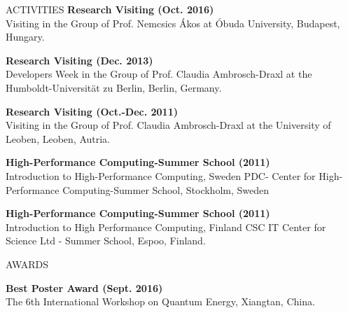 \documentclass{resume} %
\begin{document}
\begin{rSection}{ACTIVITIES}
\textbf{Research Visiting (Oct. 2016)} \\
Visiting in the Group of Prof. Nemcsics Ákos at Óbuda University, Budapest, Hungary.


\textbf{Research Visiting (Dec. 2013)} \\
Developers Week in the Group of Prof. Claudia Ambrosch-Draxl at the Humboldt-Universität zu Berlin, Berlin, Germany.

\textbf{Research Visiting (Oct.-Dec. 2011)} \\
Visiting in the Group of Prof. Claudia Ambrosch-Draxl at the University of Leoben, Leoben, Autria.

\textbf{High-Performance Computing-Summer School (2011)} \\
Introduction to High-Performance Computing, Sweden PDC- Center for High-Performance Computing-Summer School, Stockholm, Sweden

\textbf{High-Performance Computing-Summer School (2011)} \\
Introduction to High Performance Computing, Finland CSC IT Center for Science Ltd - Summer School, Espoo, Finland.

\end{rSection}


\begin{rSection}{AWARDS}

\textbf{Best Poster Award (Sept. 2016)} \\
The 6th International Workshop on Quantum Energy, Xiangtan, China.

\end{rSection}



\newpage
\end{document}
